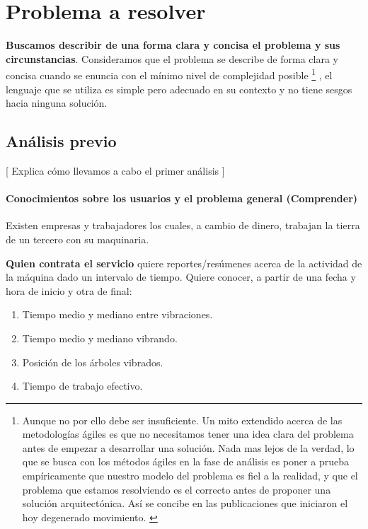 \chapter{Problema a resolver}

\textbf{Buscamos describir de una forma clara y concisa el problema y sus
circunstancias}. Consideramos que el problema se describe de forma clara y
concisa cuando se enuncia con el mínimo nivel de complejidad posible%
%
\footnote{Aunque
no por ello debe ser insuficiente. Un mito extendido acerca de las metodologías ágiles
es que no necesitamos tener una idea clara del problema antes de empezar a desarrollar
una solución. Nada mas lejos de la verdad, lo que se busca con los métodos ágiles en la
fase de análisis es poner a prueba empíricamente que nuestro modelo del problema es fiel
a la realidad, y que el problema que estamos resolviendo es el correcto antes de proponer
una solución arquitectónica. Así se concibe en las publicaciones que iniciaron el hoy
degenerado movimiento. \cite{AgileBackToBasics}
}%
, el lenguaje que se utiliza es simple pero adecuado
en su contexto y no tiene sesgos hacia ninguna solución.

\section{Análisis previo}

[ Explica cómo llevamos a cabo el primer análisis ]

\subsubsection{Conocimientos sobre los usuarios y el problema general (Comprender)}

Existen empresas y trabajadores los cuales, a cambio de dinero, trabajan la
tierra de un tercero con su maquinaria.

\textbf{Quien contrata el servicio} quiere reportes/resúmenes acerca de la actividad
de la máquina dado un intervalo de tiempo. Quiere conocer, a partir de una fecha y hora de inicio y otra de final:

\begin{enumerate}
   \item Tiempo medio y mediano entre vibraciones.
   \item Tiempo medio y mediano vibrando.
   \item Posición de los árboles vibrados.
   \item Tiempo de trabajo efectivo.
\end{enumerate}

